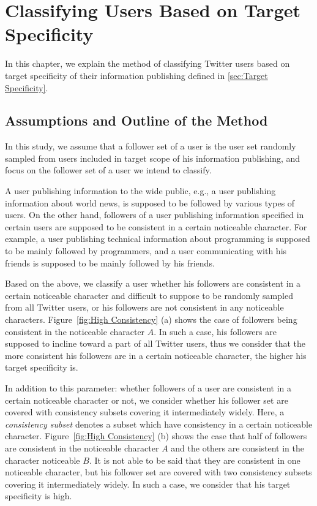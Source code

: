 \section{Classifying Users Based on Target Specificity}
\label{sec:ClassificationMethod1}

In this chapter, we explain the method of classifying Twitter users
based on target specificity of their information publishing defined
in \ref{sec:Target Specificity}.

\subsection{Assumptions and Outline of the Method}
\label{subsec:Assumptions}

In this study, we assume that a follower set of a user is the
user set randomly sampled from users included in target scope of his
information publishing, and focus on the follower set of a user we
intend to classify.

A user publishing information to the wide public, e.g., a user
publishing information about world news, is supposed to be followed
by various types of users.  On the other hand, followers of a user
publishing information specified in certain users are supposed to be
consistent in a certain noticeable character.  For example, a user
publishing technical information about programming is supposed to be
mainly followed by programmers, and a user communicating with his
friends is supposed to be mainly followed by his friends.

Based on the above, we classify a user whether his followers are consistent
in a certain noticeable character and difficult to suppose to be
randomly sampled from all Twitter users, or his followers are not
consistent in any noticeable characters.  Figure~\ref{fig:High
Consistency} (a) shows the case of followers being consistent
in the noticeable character $A$.  In such a case, his followers are
supposed to incline toward a part of all Twitter users, thus we consider
that the more consistent his followers are in a certain noticeable
character, the higher his target specificity is.

In addition to this parameter: whether followers of a user are
consistent in a certain noticeable character or not, we consider
whether his follower set are covered with consistency subsets covering it
intermediately widely.  Here, a \emph{consistency subset} denotes
a subset which have consistency in a certain noticeable character.
Figure~\ref{fig:High Consistency} (b) shows the case that half of followers
are consistent in the noticeable character $A$
and the others are consistent in the character noticeable $B$.  It is
not able to
be said that they are consistent in one noticeable character, but
his follower set are covered with two consistency subsets covering it
intermediately widely.  In such a case, we consider that his
target specificity is high.

